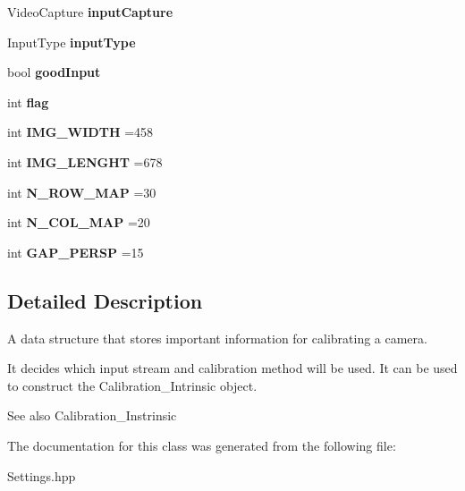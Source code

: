 \begin{DoxyCompactItemize}
Video\+Capture {\bfseries input\+Capture}
\item 
\mbox{\label{class_settings_a89fb14ce9856fb642f18bb0f7c5b8868}} 
Input\+Type {\bfseries input\+Type}
\item 
\mbox{\label{class_settings_a3b9fc27b555f982bd5b9ea5198e1f7e3}} 
bool {\bfseries good\+Input}
\item 
\mbox{\label{class_settings_aba5691e3e76525f93ea254e654ec3717}} 
int {\bfseries flag}
\item 
\mbox{\label{class_settings_a5e8532b46bca347b6fc0336480914544}} 
int {\bfseries I\+M\+G\+\_\+\+W\+I\+D\+TH} =458
\item 
\mbox{\label{class_settings_ab0fe607b4c843f4fff0b1b651fd6bf02}} 
int {\bfseries I\+M\+G\+\_\+\+L\+E\+N\+G\+HT} =678
\item 
\mbox{\label{class_settings_a8cc44bebe159b733449a2b52f99cc264}} 
int {\bfseries N\+\_\+\+R\+O\+W\+\_\+\+M\+AP} =30
\item 
\mbox{\label{class_settings_a1768a2eeed3a80ccf1a9a645b8e9e946}} 
int {\bfseries N\+\_\+\+C\+O\+L\+\_\+\+M\+AP} =20
\item 
\mbox{\label{class_settings_a08b59baafe94e711e02075edc9febfa6}} 
int {\bfseries G\+A\+P\+\_\+\+P\+E\+R\+SP} =15
\end{DoxyCompactItemize}


\subsection{Detailed Description}
A data structure that stores important information for calibrating a camera. 

It decides which input stream and calibration method will be used. It can be used to construct the Calibration\+\_\+\+Intrinsic object. \begin{DoxySeeAlso}{See also}
Calibration\+\_\+\+Instrinsic 
\end{DoxySeeAlso}


The documentation for this class was generated from the following file\+:\begin{DoxyCompactItemize}
\item 
Settings.\+hpp\end{DoxyCompactItemize}
